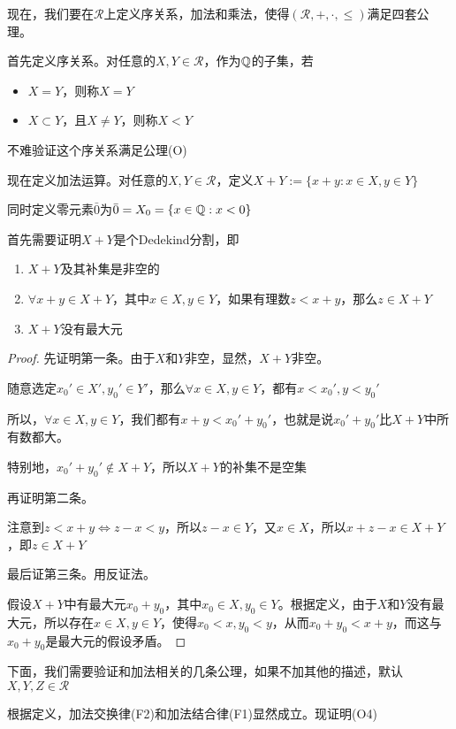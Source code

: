 现在，我们要在$\mathcal{R}$上定义序关系，加法和乘法，使得$(\mathcal{R},+,\cdot,\leq)$满足四套公理。

首先定义序关系。对任意的$X,Y\in\mathcal{R}$，作为$\mathbb{Q}$的子集，若

\begin{itemize}
    \item $X=Y$，则称$X=Y$
    \item $X\subset Y$，且$X\neq Y$，则称$X<Y$
\end{itemize}

不难验证这个序关系满足公理(O)

现在定义加法运算。对任意的$X,Y\in\mathcal{R}$，定义$X+Y:=\{x+y:x\in X,y\in Y\}$

同时定义零元素$\bar{0}$为$\bar{0}=X_0=\{x\in \mathbb{Q}:x<0\}$

首先需要证明$X+Y$是个Dedekind分割，即

\begin{enumerate}
    \item $X+Y$及其补集是非空的
    \item $\forall x+y\in X+Y$，其中$x\in X,y\in Y$，如果有理数$z<x+y$，那么$z\in X+Y$
    \item $X+Y$没有最大元
\end{enumerate}

\begin{proof}
    先证明第一条。由于$X$和$Y$非空，显然，$X+Y$非空。

    随意选定$x_0'\in X',y_0'\in Y'$，那么$\forall x\in X,y\in Y$，都有$x<x_0',y<y_0'$
    
    所以，$\forall x\in X,y\in Y$，我们都有$x+y<x_0'+y_0'$，也就是说$x_0'+y_0'$比$X+Y$中所有数都大。
    
    特别地，$x_0'+y_0'\notin X+Y$，所以$X+Y$的补集不是空集

    再证明第二条。

    注意到$z<x+y\Leftrightarrow z-x<y$，所以$z-x\in Y$，又$x\in X$，所以$x+z-x\in X+Y$，即$z\in X+Y$

    最后证第三条。用反证法。

    假设$X+Y$中有最大元$x_0+y_0$，其中$x_0\in X,y_0\in Y$。根据定义，由于$X$和$Y$没有最大元，所以存在$x\in X,y\in Y$，使得$x_0<x,y_0<y$，从而$x_0+y_0<x+y$，而这与$x_0+y_0$是最大元的假设矛盾。
\end{proof}

下面，我们需要验证和加法相关的几条公理，如果不加其他的描述，默认$X,Y,Z\in\mathcal{R}$

根据定义，加法交换律(F2)和加法结合律(F1)显然成立。现证明(O4)

